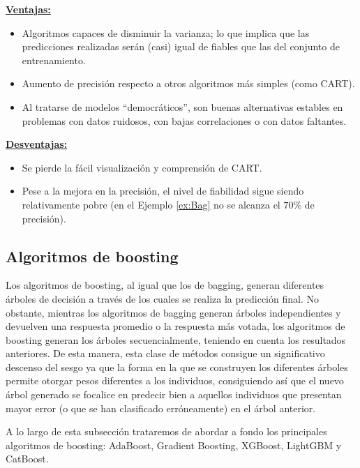 \documentclass[12pt,twoside]{article}
\begin{document}
\textbf{\underline{Ventajas:}}
\begin{itemize}
\item  Algoritmos capaces de disminuir la varianza; lo que implica que las predicciones realizadas serán (casi) igual de fiables que las del conjunto de entrenamiento.
\item Aumento de precisión respecto a otros algoritmos más simples (como CART).
\item Al tratarse de modelos ``democráticos'', son buenas alternativas estables en problemas con datos ruidosos, con bajas correlaciones o con datos faltantes.
\end{itemize}

\textbf{\underline{Desventajas:}}
\begin{itemize}
\item Se pierde la fácil visualización y comprensión de CART.
\item Pese a la mejora en la precisión, el nivel de fiabilidad sigue siendo relativamente pobre (en el Ejemplo \ref{ex:Bag} no se alcanza el $70 \%$ de precisión).
\end{itemize}



\subsection{Algoritmos de boosting}
Los algoritmos de boosting, al igual que los de bagging, generan diferentes árboles de decisión a través de los cuales se realiza la predicción final. No obstante, mientras los algoritmos de bagging generan árboles independientes y devuelven una respuesta promedio o la respuesta más votada, los algoritmos de boosting generan los árboles secuencialmente, teniendo en cuenta los resultados anteriores. De esta manera, esta clase de métodos consigue un significativo descenso del sesgo ya que la forma en la que se construyen los diferentes árboles permite otorgar pesos diferentes a los individuos, consiguiendo así que el nuevo árbol generado se focalice en predecir bien a aquellos individuos que presentan mayor error (o que se han clasificado erróneamente) en el árbol anterior.

A lo largo de esta subsección trataremos de abordar a fondo los principales algoritmos de boosting: AdaBoost, Gradient Boosting, XGBoost, LightGBM y CatBoost.
\end{document}
